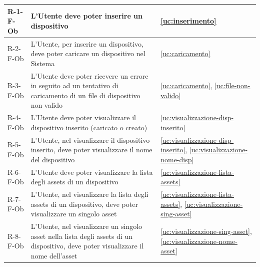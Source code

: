 ﻿\documentclass[a4paper,12pt]{article}
\begin{document}
{{\begin{longtable}{|l|p{}|p{}|}
            R-1-F-Ob        & L'Utente deve poter inserire un dispositivo                                                                                                                                                 & \ref{uc:inserimento}                                                 \\ \hline
            R-2-F-Ob        & L'Utente, per inserire un dispositivo, deve poter caricare un dispositivo nel Sistema                                                                                                       & \ref{uc:caricamento}                                                 \\ \hline
            R-3-F-Ob        & L'Utente deve poter ricevere un errore in seguito ad un tentativo di caricamento di un file di dispositivo non valido                                                                       & \ref{uc:caricamento}, \ref{uc:file-non-valido}                         \\ \hline
            R-4-F-Ob        & L'Utente deve poter visualizzare il dispositivo inserito (caricato o creato)                                                                                                                & \ref{uc:visualizzazione-disp-inserito}                                                 \\ \hline
            R-5-F-Ob        & L'Utente, nel visualizzare il dispositivo inserito, deve poter visualizzare il nome del dispositivo                                                                                         & \ref{uc:visualizzazione-disp-inserito}, \ref{uc:visualizzazione-nome-disp}                   \\ \hline
            R-6-F-Ob        & L'Utente deve poter visualizzare la lista degli assets di un dispositivo                                                                                                                    & \ref{uc:visualizzazione-lista-assets}                                                 \\ \hline
            R-7-F-Ob        & L'Utente, nel visualizzare la lista degli assets di un dispositivo, deve poter visualizzare un singolo asset                                                                                & \ref{uc:visualizzazione-lista-assets}, \ref{uc:visualizzazione-sing-asset}                     \\ \hline
            R-8-F-Ob        & L'Utente, nel visualizzare un singolo asset nella lista degli assets di un dispositivo, deve poter visualizzare il nome dell'asset                                                          & \ref{uc:visualizzazione-sing-asset}, \ref{uc:visualizzazione-nome-asset}               \\ \hline

\end{longtable}}}
\end{document}
